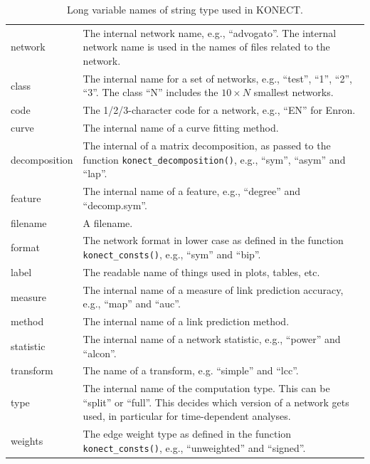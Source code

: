 \documentclass{article}
\begin{document}
\begin{table}
  \caption{ 
    Long variable names of string type used in KONECT.
    \label{tab:string-variables}
  } 
  \centering
  \begin{tabular}{>{\ttfamily}lp{}}
    \toprule 
    network & The internal network name, e.g., ``advogato''.
    The internal network name is used in the names of files related to
    the network. \\ 

    class &
    The internal name for a set of networks, e.g., ``test'', ``1'',
    ``2'', ``3''. The class ``N'' includes the $10\times N$ smallest
    networks. \\ 
    code & The 1/2/3-character code for a network, e.g.,
    ``EN'' for Enron.  \\ 
    curve & The internal name of a curve fitting method. \\ 
    decomposition & The internal of a matrix decomposition, as passed to the function
    \texttt{konect\_decomposition()}, e.g., ``sym'', ``asym'' and ``lap''. \\ 
    feature & The internal name of a
    feature, e.g., ``degree'' and ``decomp.sym''.  \\ 
    filename & A filename. \\ 
    format & The network format in lower case as defined in
    the function \texttt{konect\_consts()}, e.g., ``sym'' and ``bip''. \\ 
    label &
    The readable name of things used in plots, tables, etc.  \\ 
    measure & The internal name of a measure
    of link prediction accuracy, e.g., ``map'' and ``auc''. \\ 
    method & The internal name of a
    link prediction method.  \\ 
    statistic & The internal name of a network
    statistic, e.g., ``power'' and ``alcon''.  \\ 
    transform & The name of a transform, e.g. ``simple'' and ``lcc''. \\
    type & The internal name of
    the computation type. This can be ``split'' or ``full''. This
    decides which version of a network gets used, in particular for
    time-dependent analyses.  \\ 
    weights & The edge weight type as defined in the function
    \texttt{konect\_consts()}, e.g., ``unweighted'' and
    ``signed''. \\ 

    \bottomrule
\end{tabular}
\end{table}
\end{document}
